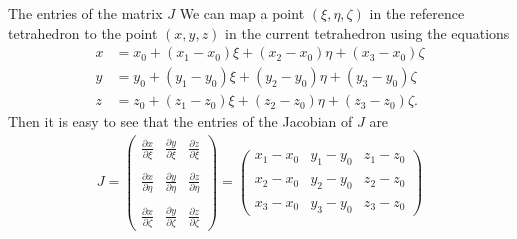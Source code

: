 \documentclass[handout]{beamer}
{
\usepackage{fullpage}
\usepackage{hyperref}
\usepackage{amssymb} 
}
\newcommand{\pmat}[1]{\begin{pmatrix}#1\end{pmatrix}}
\newcommand{\pder}[2]{\frac{\partial #1}{\partial #2}}
\begin{document}
\begin{frame}{The entries of the matrix $J$}
We can map a point $(\xi,\eta,\zeta)$ in the reference tetrahedron
to the point $(x,y,z)$ in the current tetrahedron using the 
equations 
\begin{align*}
x   &= x_0 + (x_1 - x_0) \xi + (x_2 - x_0) \eta + (x_3 - x_0) \zeta\\
y   &= y_0 + (y_1 - y_0) \xi + (y_2 - y_0) \eta + (y_3 - y_0) \zeta \\
z   &= z_0 + (z_1 - z_0) \xi + (z_2 - z_0) \eta + (z_3 - z_0) \zeta. 
\end{align*}
Then it is easy to see that the entries of the Jacobian of $J$ are
\begin{align*}
J=
\pmat{ \pder{x}{\xi}   & \pder{y}{\xi}   & \pder{z}{\xi} \\ \\
       \pder{x}{\eta}  & \pder{y}{\eta}  & \pder{z}{\eta} \\ \\
       \pder{x}{\zeta} & \pder{y}{\zeta} & \pder{z}{\zeta}
}
 = \pmat{ x_1 - x_0 & y_1 - y_0 & z_1 - z_0 
 \\ \\ 
          x_2 - x_0 & y_2 - y_0 & z_2 - z_0
 \\ \\
          x_3 - x_0 & y_3 - y_0 & z_3 - z_0}
\end{align*}

\end{frame}
\end{document}

